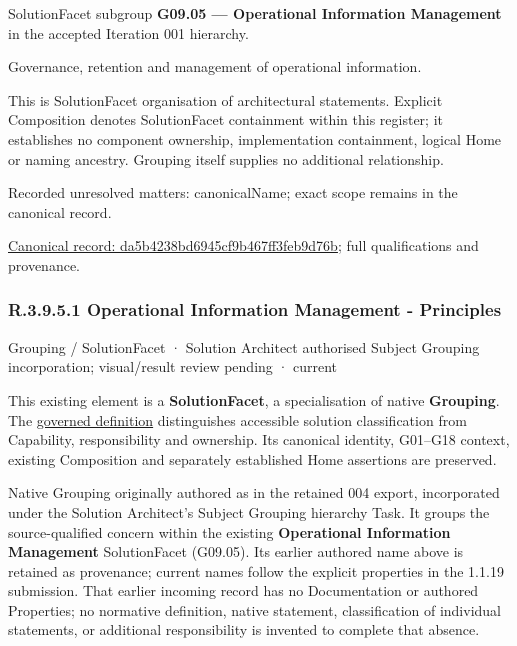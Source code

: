 SolutionFacet subgroup \textbf{G09.05 — Operational Information Management} in the accepted Iteration 001 hierarchy.



Governance, retention and management of operational information.



This is SolutionFacet organisation of architectural statements. Explicit Composition denotes SolutionFacet containment within this register; it establishes no component ownership, implementation containment, logical Home or naming ancestry. Grouping itself supplies no additional relationship.


{\small Recorded unresolved matters: canonicalName; exact scope remains in the canonical record.}\par
{\footnotesize \href{../../../../../../../continuum/grouping/da5b4238bd6945cf9b467ff3feb9d76b.md}{Canonical record: da5b4238bd6945cf9b467ff3feb9d76b}; full qualifications and provenance.}\par
\subsubsection*{R.3.9.5.1 Operational Information Management - Principles}
\label{navigation:R.3.9.5.1}

\label{element:63807867e2d147528542a914952b3e3e}
{\small Grouping / SolutionFacet · Solution Architect authorised Subject Grouping incorporation; visual/result review pending · current}\par

This existing element is a \textbf{SolutionFacet}, a specialisation of native
\textbf{Grouping}. The \href{\detokenize{../../../../../../../governance/continuum-representation.md#solutionfacet-classification--1119-candidate}}{governed definition}
distinguishes accessible solution classification from Capability, responsibility
and ownership. Its canonical identity, G01–G18 context, existing Composition
and separately established Home assertions are preserved.



Native Grouping originally authored as \texttt{} in the retained 004 export,
incorporated under the Solution Architect's Subject Grouping hierarchy Task.
It groups the source-qualified \texttt{} concern within
the existing \textbf{Operational Information Management} SolutionFacet (G09.05). Its earlier authored name above is retained as provenance; current names
follow the explicit properties in the 1.1.19 submission.
That earlier incoming record has no Documentation or authored Properties; no normative
definition, native statement, classification of individual statements, or
additional responsibility is invented to complete that absence.




